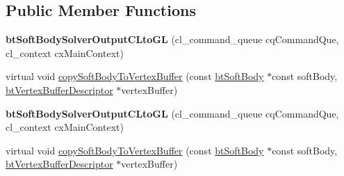 \subsection*{Public Member Functions}
\begin{DoxyCompactItemize}
\item 
\mbox{\label{classbtSoftBodySolverOutputCLtoGL_a38b710a54d801ca771a192e0fdddeee0}} 
{\bfseries bt\+Soft\+Body\+Solver\+Output\+C\+Lto\+GL} (cl\+\_\+command\+\_\+queue cq\+Command\+Que, cl\+\_\+context cx\+Main\+Context)
\item 
virtual void \hyperlink{classbtSoftBodySolverOutputCLtoGL_ab6f232898b815166551373a6c2d95b58}{copy\+Soft\+Body\+To\+Vertex\+Buffer} (const \hyperlink{classbtSoftBody}{bt\+Soft\+Body} $\ast$const soft\+Body, \hyperlink{classbtVertexBufferDescriptor}{bt\+Vertex\+Buffer\+Descriptor} $\ast$vertex\+Buffer)
\item 
\mbox{\label{classbtSoftBodySolverOutputCLtoGL_a38b710a54d801ca771a192e0fdddeee0}} 
{\bfseries bt\+Soft\+Body\+Solver\+Output\+C\+Lto\+GL} (cl\+\_\+command\+\_\+queue cq\+Command\+Que, cl\+\_\+context cx\+Main\+Context)
\item 
virtual void \hyperlink{classbtSoftBodySolverOutputCLtoGL_a4e5b99808b1072064295810529c7755a}{copy\+Soft\+Body\+To\+Vertex\+Buffer} (const \hyperlink{classbtSoftBody}{bt\+Soft\+Body} $\ast$const soft\+Body, \hyperlink{classbtVertexBufferDescriptor}{bt\+Vertex\+Buffer\+Descriptor} $\ast$vertex\+Buffer)
\end{DoxyCompactItemize}
